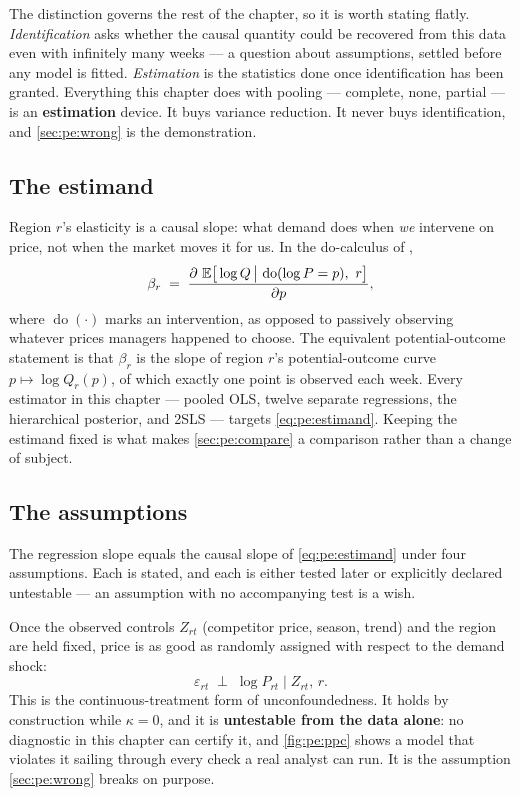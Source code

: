 The distinction governs the rest of the chapter, so it is worth stating flatly.
\emph{Identification} asks whether the causal quantity could be recovered from this data even with
infinitely many weeks --- a question about assumptions, settled before any model is fitted.
\emph{Estimation} is the statistics done once identification has been granted. Everything this
chapter does with pooling --- complete, none, partial --- is an \textbf{estimation} device. It buys
variance reduction. It never buys identification, and \cref{sec:pe:wrong} is the demonstration.

\subsection*{The estimand}

Region $r$'s elasticity is a causal slope: what demand does when \emph{we} intervene on price, not
when the market moves it for us. In the do-calculus of \citet{pearl2009},
%
\begin{equation}
  \beta_r \;=\;
  \frac{\partial\, \operatorname{\mathbb{E}}\!\big[\log Q \,\big|\, \operatorname{do}(\log P = p),\ r\big]}{\partial p},
  \label{eq:pe:estimand}
\end{equation}
%
where $\operatorname{do}(\cdot)$ marks an intervention, as opposed to passively observing whatever
prices managers happened to choose. The equivalent potential-outcome statement
\citep{rubin1974, imbens2015} is that $\beta_r$ is the slope of region $r$'s potential-outcome
curve $p \mapsto \log Q_{r}(p)$, of which exactly one point is observed each week. Every estimator
in this chapter --- pooled OLS, twelve separate regressions, the hierarchical posterior, and 2SLS
--- targets \cref{eq:pe:estimand}. Keeping the estimand fixed is what makes \cref{sec:pe:compare} a
comparison rather than a change of subject.

\subsection*{The assumptions}

The regression slope equals the causal slope of \cref{eq:pe:estimand} under four assumptions. Each
is stated, and each is either tested later or explicitly declared untestable --- an assumption with
no accompanying test is a wish.

\begin{assumption}\label{as:pe:exog}
Once the observed controls $Z_{rt}$ (competitor price, season, trend) and the region are held
fixed, price is as good as randomly assigned with respect to the demand shock:
%
\[
  \varepsilon_{rt} \;\perp\; \log P_{rt} \;\big|\; Z_{rt},\, r .
\]
%
This is the continuous-treatment form of unconfoundedness. It holds by construction while
$\kappa = 0$, and it is \textbf{untestable from the data alone}: no diagnostic in this chapter can
certify it, and \cref{fig:pe:ppc} shows a model that violates it sailing through every check a real
analyst can run. It is the assumption \cref{sec:pe:wrong} breaks on purpose.
\end{assumption}


